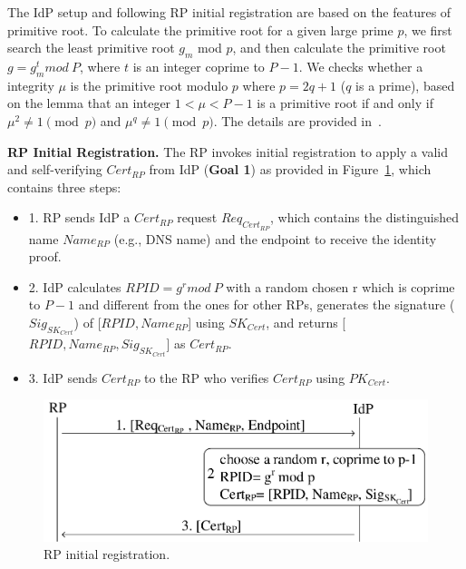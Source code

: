 The IdP setup and following RP initial registration are based on the features of primitive root. To calculate the primitive root for a given large prime $p$,  we first search the least primitive root $g_m$  mod $p$, and then calculate the primitive root $g = g_{m}^{t} mod \ P$, where $t$ is an integer coprime to $P-1$.
We checks whether a integrity $\mu$ is the primitive root modulo $p$ where $p=2q+1$ ($q$ is a prime), based on the lemma that an integer $1<\mu <P-1$ is a primitive root if and only if $\mu^2\neq 1 \pmod p$ and $\mu^q\neq 1 \pmod p$.
The details are provided in~\cite{Shoup,Wang}.


\noindent\textbf{RP Initial Registration.} The RP invokes initial registration to apply a valid and self-verifying $Cert_{RP}$ from IdP (\textbf{Goal 1}) as provided in Figure~\ref{fig:registration}, which contains three steps:
\begin{itemize}
\item 1. RP sends IdP a $Cert_{RP}$ request $Req_{Cert_{RP}}$, which contains the distinguished name $Name_{RP}$ (e.g., DNS name) and the endpoint to receive the identity proof.
\item 2. IdP calculates $RPID = g^r mod \ P$ with a random chosen r which is coprime to $P-1$ and different from the ones for other RPs,  generates the signature ($Sig_{SK_{Cert}}$) of [$RPID, Name_{RP}$] using $SK_{Cert}$, and returns [$RPID, Name_{RP}, Sig_{SK_{Cert}}$] as $Cert_{RP}$.
\item 3. IdP sends $Cert_{RP}$ to the RP who verifies $Cert_{RP}$ using $PK_{Cert}$.
\end{itemize}

\begin{figure}
  \centering
  \includegraphics[width=\linewidth]{fig/registration.pdf}
  \caption{RP initial registration.}
  \label{fig:registration}
\end{figure}

